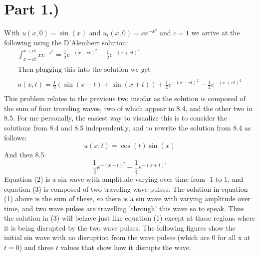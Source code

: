 \documentclass{article}
\begin{document}
\section*{Part 1.)} 
With $u(x,0) = \sin(x)$ and $u_t(x,0) = xe^{-x^2}$ and $c = 1$ we arrive at the following using the D'Alembert solution:
\begin{equation}
\begin{aligned}
\int_{x-ct}^{x+ct} xe^{-x^2} = \frac{1}{2}e^{-(x-ct)^2} - \frac{1}{2}e^{-(x+ct)^2}\\
\\
\text{Then plugging this into the solution we get }\\
\\
u(x,t) = \frac{1}{2}(\sin (x - t) + \sin (x + t)) +  \frac{1}{4}e^{-(x-ct)^2} - \frac{1}{4}e^{-(x+ct)^2}\\
\end{aligned}
\end{equation}
This problem relates to the previous two insofar as the solution is composed of the sum of four traveling waves, two of which appear in 8.4, and the other two in 8.5. For me personally, the easiest way to visualize this is to consider the solutions from 8.4 and 8.5 independently, and to rewrite the solution from 8.4 as follows:
\begin{equation}
u(x,t) = \cos (t)\sin (x)
\end{equation}
And then 8.5:
\begin{equation}
\frac{1}{4}e^{-(x-t)^2} - \frac{1}{4}e^{-(x+t)^2}
\end{equation}
Equation (2) is a sin wave with amplitude varying over time from -1 to 1, and equation (3) is composed of two traveling wave pulses. The solution in equation (1) above is the sum of these, so there is a sin wave with varying amplitude over time, and two wave pulses are travelling 'through' this wave so to speak. Thus the solution in (3) will behave just like equation (1) except at those regions where it is being disrupted by the two wave pulses. The following figures show the initial sin wave with no disruption from the wave pulses (which are 0 for all x at $t=0$) and three $t$ values that show how it disrupts the wave.
\end{document}
